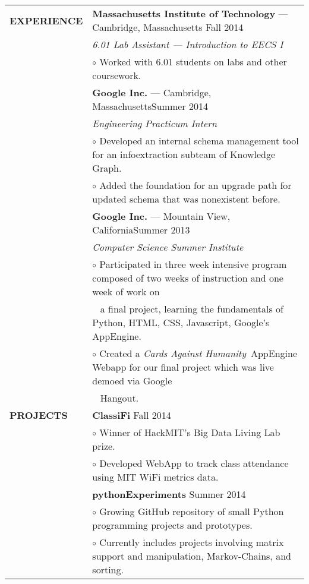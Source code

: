 \documentclass[11pt,letterpaper]{article}
\begin{document}
\begin{tabular}{@{}lp{6.6in}}
\textbf{EXPERIENCE}
&\textbf{Massachusetts Institute of Technology} --- Cambridge, Massachusetts \hfill Fall 2014\\
&\emph{6.01 Lab Assistant --- Introduction to EECS I}\\
&\hspace{10pt}$\circ$ Worked with 6.01 students on labs and other coursework.\\

&\textbf{Google Inc.} --- Cambridge, Massachusetts\hfill Summer 2014\\
&\emph{Engineering Practicum Intern}\\
&\hspace{10pt}$\circ$ Developed an internal schema management tool for an infoextraction subteam of Knowledge Graph. \\ 
&\hspace{10pt}$\circ$ Added the foundation for an upgrade path for updated schema that was nonexistent before.\\

&\textbf{Google Inc.} --- Mountain View, California\hfill Summer 2013\\
&\emph{Computer Science Summer Institute}\\
&\hspace{10pt}$\circ$ Participated in three week intensive program composed of two weeks of instruction and one week of work on\\ &\ \hspace{3ex} a final project, learning the fundamentals of Python, HTML, CSS, Javascript, Google's AppEngine.\\
&\hspace{10pt}$\circ$ Created a \emph{Cards Against Humanity}\ AppEngine Webapp for our final project which was live demoed via Google \\ 
&\ \hspace{3ex} Hangout.\\

\textbf{PROJECTS}

&\textbf{ClassiFi} \hfill Fall 2014\\
&\hspace{10pt}$\circ$ Winner of HackMIT's Big Data Living Lab prize. \\
&\hspace{10pt}$\circ$ Developed WebApp to track class attendance using MIT WiFi metrics data. \\

&\textbf{pythonExperiments} \hfill Summer 2014\\
&\hspace{10pt}$\circ$ Growing GitHub repository of small Python programming projects and prototypes.\\ 
&\hspace{10pt}$\circ$ Currently includes projects involving matrix support and manipulation, Markov-Chains, and sorting.\\


\end{tabular}
\end{document}

